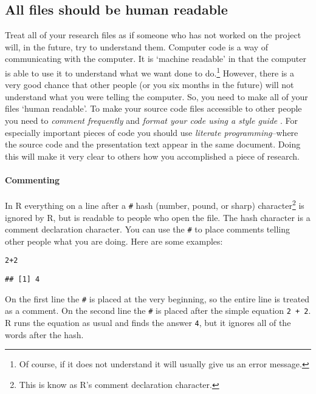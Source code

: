 {\subsection{All files should be human readable}

Treat all of your research files as if someone who has not worked on the project will, in the future, try to understand them. Computer code is a way of communicating with the computer. It is `machine readable' in that the computer is able to use it to understand what we want done to do.\footnote{Of course, if it does not understand it will usually give us an error message.} However, there is a very good chance that other people (or you six months in the future) will not understand what you were telling the computer. So, you need to make all of your files `human readable'. To make your source code files accessible to other people you need to {\emph{comment frequently}} \cite[3]{Bowers2011} and {\emph{format your code using a style guide}} \cite[]{Nagler1995}. For especially important pieces of code you should use {\emph{literate programming}}--where the source code and the presentation text appear in the same document. Doing this will make it very clear to others how you accomplished a piece of research.

\paragraph{Commenting}
In R everything on a line after a {\tt{\#}} hash (number, pound, or sharp) character\footnote{This is know as R's comment declaration character.} is ignored by R, but is readable to people who open the file. The hash character is a comment declaration character. You can use the {\tt{\#}} to place comments telling other people what you are doing. Here are some examples:

\begin{knitrout}
\color{fgcolor}\begin{kframe}
\begin{alltt}
2 + 2  
\end{alltt}
\begin{verbatim}
## [1] 4
\end{verbatim}
\end{kframe}
\end{knitrout}


\noindent On the first line the {\tt{\#}} is placed at the very beginning, so the entire line is treated as a comment. On the second line the {\tt{\#}} is placed after the simple equation \texttt{2 + 2}. R runs the equation as usual and finds the answer {\tt{4}}, but it ignores all of the words after the hash. 

}
